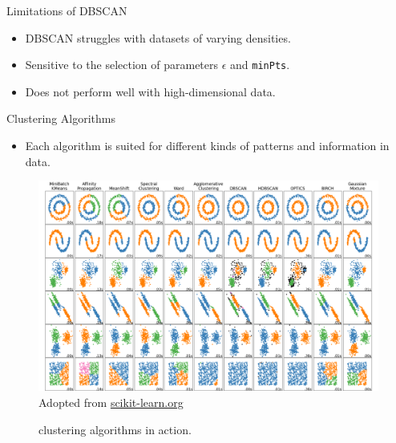 \documentclass[serif, aspectratio=169]{beamer}
\begin{document}
\begin{frame}{Limitations of DBSCAN}
    \begin{itemize}
        \item DBSCAN struggles with datasets of varying densities.
        \item Sensitive to the selection of parameters $ \epsilon $ and \texttt{minPts}.
        \item Does not perform well with high-dimensional data.
    \end{itemize}
\end{frame}


\begin{frame}{Clustering Algorithms}
\begin{itemize}
 \item Each algorithm is suited for different kinds of patterns and information in data.
\end{itemize}
\begin{figure}
    \centering
    \includegraphics[width=\textwidth]{pic/figs/sphx_glr_plot_cluster_comparison_001.png}{\scriptsize Adopted from \href{https://scikit-learn.org/stable/auto_examples/cluster/plot_cluster_comparison.html}{scikit-learn.org}}
    \caption{clustering algorithms in action.}
    \label{fig:clustering algorithms}
\end{figure}
\end{frame}


        
\end{document}
